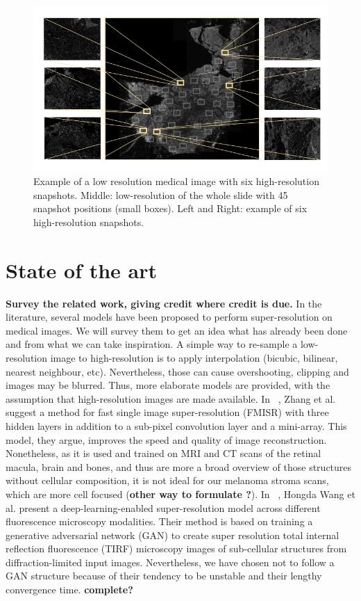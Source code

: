 \documentclass[11pt,conference,compsocconf]{IEEEtran}
\begin{document}
 \begin{figure}[tbp]
  \centering
  \includegraphics[width=\columnwidth]{doc/report/images/scan1.jpg}
  \caption{Example of a low resolution medical image with six high-resolution
snapshots. Middle: low-resolution of the whole slide with 45 snapshot positions
(small boxes). Left and Right: example of six high-resolution snapshots.}
  \vspace{-3mm}
  \label{fig:melanoma-scan}
\end{figure}


\section{State of the art}\label{sec:state-of-art}
\textbf{Survey the related work, giving credit where credit is
  due.} In the literature, several models have been proposed to perform super-resolution on medical images. We will survey them to get an idea what has already been done and from what we can take inspiration. A simple way to re-sample a low-resolution image to high-resolution is to apply interpolation (bicubic, bilinear, nearest neighbour, etc). Nevertheless, those can cause overshooting, clipping and images may be blurred. Thus, more elaborate models are provided, with the assumption that high-resolution images are made available. In ~\cite{zhang2019}, Zhang et al. suggest a method for fast single image super-resolution (FMISR) with three hidden layers in addition to a sub-pixel convolution layer and a mini-array. This model, they argue, improves the speed and quality of image reconstruction. Nonetheless, as it is used and trained on MRI and CT scans of the retinal macula, brain and bones, and thus are more a broad overview of those structures without cellular composition, it is not ideal for our melanoma stroma scans, which are more cell focused (\textbf{other way to formulate ?}). In ~\cite{nature2019}, Hongda Wang et al. present a deep-learning-enabled super-resolution model across different fluorescence microscopy modalities. Their method is based on training a generative adversarial network (GAN) to create super resolution total internal reflection fluorescence (TIRF) microscopy images of sub-cellular structures from diffraction-limited input images. Nevertheless, we have chosen not to follow a GAN structure because of their tendency to be unstable and their lengthy convergence time. \textbf{complete?}
  
\end{document}
